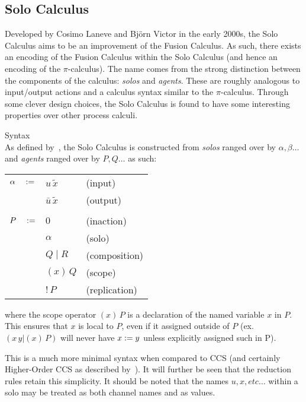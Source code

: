 \subsection{Solo Calculus}

    Developed by Cosimo Laneve and Bj{\"o}rn Victor in the early 2000s, the Solo Calculus aims to be an improvement of the Fusion Calculus.
    As such, there exists an encoding of the Fusion Calculus within the Solo Calculus (and hence an encoding of the $\pi$-calculus).
    The name comes from the strong distinction between the components of the calculus: \textit{solos} and \textit{agents}.
    These are roughly analogous to input/output actions and a calculus syntax similar to the $\pi$-calculus.
    Through some clever design choices, the Solo Calculus is found to have some interesting properties over other process calculi.

    \begin{definition}{Syntax\\}
        \label{solo-calculus-syntax}
        As defined by~\cite{solo-calculus}, the Solo Calculus is constructed from \textit{solos} ranged over by $\alpha, \beta \ldots$ and \textit{agents} ranged over by $P, Q \ldots$ as such:
        \begin{center}
            \begin{tabular}{ l l l }
                $\alpha \quad :=$   & $u \, \tilde{x}$          & (input) \\
                                        & $\bar{u} \, \tilde{x}$    & (output)~\footnotemark\\ \\
                $P \quad :=$        & $0$                       & (inaction) \\
                                        & $\alpha$                  & (solo) \\
                                        & $Q \; | \; R$             & (composition) \\
                                        & $(x) \, Q$                & (scope) \\
                                        & $!\,P$                    & (replication)
            \end{tabular}
        \end{center}
        where the scope operator $(x) \, P $ is a declaration of the named variable $x$ in $P$.
        This ensures that $x$ is local to $P$, even if it assigned outside of $P$ (ex. $(x \, y | (x) \, P)$ will never have $x := y$ unless explicitly assigned such in P).
    \end{definition}
    This is a much more minimal syntax when compared to CCS (and certainly Higher-Order CCS as described by~\cite{pi-calculus-in-ccs}).
    It will further be seen that the reduction rules retain this simplicity.
    It should be noted that the names $u, x, etc\ldots$ within a solo may be treated as both channel names and as values.


